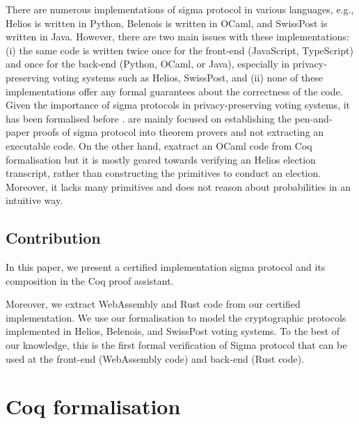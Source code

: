 \documentclass[sigconf]{acmart}
\begin{document}
There are numerous implementations of sigma protocol in various languages, 
e.g., Helios is written in Python, Belenois is written in OCaml, and SwissPost is written in Java.
However, there are two main issues with these implementations: (i)  
the same code is written twice 
once for the front-end (JavaScript, TypeScript) and once for the back-end (Python, OCaml, or Java),
especially in privacy-preserving voting systems such as Helios, SwissPost, and 
(ii) none of these implementations offer any formal guarantees about the correctness of the code.
Given the importance of sigma protocols in privacy-preserving voting systems,
it has been formalised before  \cite{5552642,butler2019formalisation,10.1145/3319535.3354247}. 
\cite{5552642,butler2019formalisation} are mainly focused on establishing the 
pen-and-paper proofs of sigma protocol into theorem provers and not extracting an executable code.
On the other hand, \cite{10.1145/3319535.3354247} exatract an OCaml code from Coq 
formalisation but it is mostly geared towards verifying an Helios election transcript, 
rather than constructing the primitives to conduct an election. Moreover, 
it lacks many primitives and does not reason about probabilities in an intuitive way.


\subsection{Contribution}
In this paper, we present a certified implementation sigma protocol and its composition 
in the Coq proof assistant.


Moreover, we extract WebAssembly and Rust code from our 
certified implementation. 
We use our formalisation to model the cryptographic protocols implemented in Helios, 
Belenois, and SwissPost voting systems. To the best of our knowledge, this is the first
formal verification of Sigma protocol that can be used at the front-end (WebAssembly code) and
back-end (Rust code). 





\section{Coq formalisation}
\end{document}
